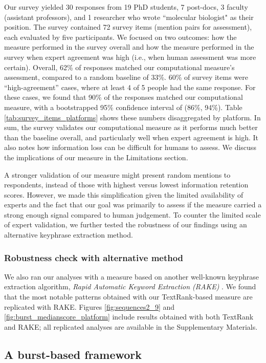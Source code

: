 \documentclass[letterpaper]{article} %
\begin{document}
Our survey yielded 30 responses from 19 PhD students, 7 post-docs, 3 faculty (assistant professors), and 1 researcher who wrote ``molecular biologist" as their position. The survey contained 72 survey items (mention pairs for assessment), each evaluated by five participants. We focused on two outcomes: how the measure performed in the survey overall and how the measure performed in the survey when expert agreement was high (i.e., when human assessment was more certain).
Overall, 62\% of responses matched our computational measure's assessment, compared to a random baseline of 33\%. 60\% of survey items were ``high-agreement'' cases, where at least 4 of 5 people had the same response. For these cases, we found that 90\% of the responses matched our computational measure, with a bootstrapped 95\% confidence interval of (86\%, 94\%). Table \ref{tab:survey_items_platforms} shows these numbers disaggregated by platform.
In sum, the survey validates our computational measure as it performs much better than the baseline overall, and particularly well when expert agreement is high. It also notes how information loss can be difficult for humans to assess. We discuss the implications of our measure in the Limitations section.

A stronger validation of our measure might present random mentions to respondents, instead of those with highest versus lowest information retention scores. However, we made this simplification given the limited availability of experts and the fact that our goal was primarily to assess if the measure carried a strong enough signal compared to human judgement. To counter the limited scale of expert validation, we further tested the robustness of our findings using an alternative keyphrase extraction method.

\subsubsection{Robustness check with alternative method} We also ran our analyses with a measure based on another well-known keyphrase extraction algorithm, {\emph{Rapid Automatic Keyword Extraction (RAKE)}} \cite{roseAutomaticKeywordExtraction2010}. We found that the most notable patterns obtained with our TextRank-based measure are replicated with RAKE. Figures \ref{fig:sequences2_9} and \ref{fig:burst_medianscore_platform} include results obtained with both TextRank and RAKE; all replicated analyses are available in the Supplementary Materials.

\subsection{A burst-based framework}
\end{document}
